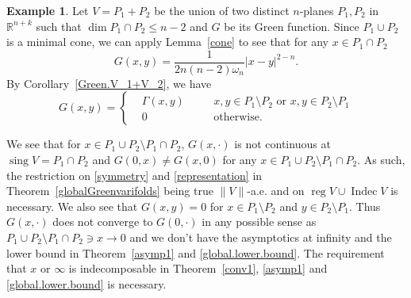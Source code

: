 \documentclass[11pt]{amsart}
\theoremstyle{definition}
\newtheorem{example}[theorem]{Example}
\newcommand{\R}{\mathbb{R}}
\DeclareMathOperator{\sing}{sing}
\DeclareMathOperator{\reg}{reg}
\DeclareMathOperator{\indec}{Indec}
\begin{document}
\begin{example}\label{2Planesn-2}
	Let $V=P_1+P_2$ be the union of two distinct $n$-planes $P_1,P_2$ in $\R^{n+k}$ such that $\dim P_1\cap P_2\le n-2$ and $G$ be its Green function. Since $P_1\cup P_2$ is a minimal cone, we can apply Lemma~\ref{cone} to see that for any $x\in P_1\cap P_2$
	\[G(x,y)=\frac{1}{2n(n-2)\omega_n}|x-y|^{2-n}.\]By Corollary~\ref{Green.V_1+V_2}, we have
	\[G(x,y)=\left\{\begin{aligned}
		&\Gamma(x,y)&\quad& x,y\in P_1\setminus P_2\text{ or }x,y\in P_2\setminus P_1\\
		&0 &\quad &\text{otherwise.}
	\end{aligned}\right.\]  
	
	We see that for $x\in P_1\cup P_2\setminus P_1\cap P_2$, $G(x,\cdot)$ is not continuous at $\sing V=P_1\cap P_2$ and $G(0,x)\neq G(x,0)$ for any $x\in P_1\cup P_2\setminus P_1\cap P_2$. As such, the restriction on \eqref{symmetry} and \eqref{representation} in Theorem~\ref{globalGreenvarifolds} being true $\|V\|$-a.e. and on $\reg V\cup \indec V$ is necessary. We also see that $G(x,y)=0$ for $x\in P_1\setminus P_2$ and $y\in P_2\setminus P_1$. Thus $G(x,\cdot)$ does not converge to $G(0,\cdot)$ in any possible sense as $ P_1\cup P_2\setminus P_1\cap P_2\ni x\to0$ and we don't have the asymptotics at infinity and the lower bound in Theorem~\ref{asymp1} and \ref{global.lower.bound}. The requirement that $x$ or $\infty$ is indecomposable in Theorem~\ref{conv1}, \ref{asymp1} and \ref{global.lower.bound} is necessary.
\end{example}
\end{document}
